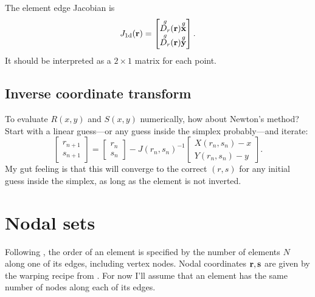 The element edge Jacobian is
%
\begin{equation}
J_\textrm{1d}(\textbf{r}) =
\begin{bmatrix}
\overset{g}{D_r}(\textbf{r}) \overset{g}{\textbf{x}} \\
\overset{g}{D_r}(\textbf{r}) \overset{g}{\textbf{y}}
\end{bmatrix}.
\end{equation}
%
It should be interpreted as a $2 \times 1$ matrix for each point.

\subsection{Inverse coordinate transform}

To evaluate $R(x,y)$ and $S(x,y)$ numerically, how about Newton's method?  Start with a linear guess---or any guess inside the simplex probably---and iterate:
%
\begin{equation}
\boxed{
\begin{bmatrix} r_{n+1} \\ s_{n+1} \end{bmatrix}
=
\begin{bmatrix} r_n \\ s_n \end{bmatrix}
-
J(r_n, s_n)^{-1}
\begin{bmatrix}X(r_n, s_n) - x \\ Y(r_n, s_n) - y \end{bmatrix}.
}%
\end{equation}
%
My gut feeling is that this will converge to the correct $(r,s)$ for any initial guess inside the simplex, as long as the element is not inverted.

\section{Nodal sets}

Following \cite{hesthaven2007nodal}, the order of an element is specified by the number of elements $N$ along one of its edges, including vertex nodes.  Nodal coordinates $\textbf{r}, \textbf{s}$ are given by the warping recipe from \cite{hesthaven2007nodal}.  For now I'll assume that an element has the same number of nodes along each of its edges.


